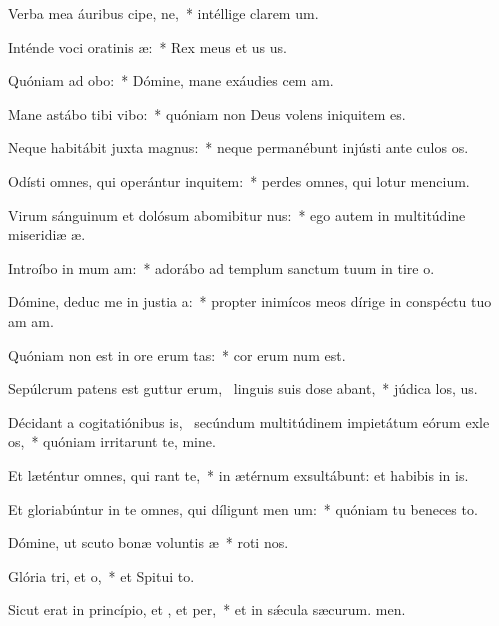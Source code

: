 \item Verba mea áuribus cipe, ne,~* intéllige clarem um.
\item Inténde voci oratinis æ:~* Rex meus et us us.
\item Quóniam ad  obo:~* Dómine, mane exáudies cem am.
\item Mane astábo tibi  vibo:~* quóniam non Deus volens iniquitem  es.
\item Neque habitábit juxta  magnus:~* neque permanébunt injústi ante culos os.
\item Odísti omnes, qui operántur inquitem:~* perdes omnes, qui lotur mencium.
\item Virum sánguinum et dolósum abomibitur nus:~* ego autem in multitúdine miseridiæ æ.
\item Introíbo in mum am:~* adorábo ad templum sanctum tuum in tire o.
\item Dómine, deduc me in justia a:~* propter inimícos meos dírige in conspéctu tuo am am.
\item Quóniam non est in ore erum tas:~* cor erum num est.
\item Sepúlcrum patens est guttur erum,~\pscross{} linguis suis dose abant,~* júdica los, us.
\item Décidant a cogitatiónibus is,~\pscross{} secúndum multitúdinem impietátum eórum exle os,~* quóniam irritarunt te, mine.
\item Et læténtur omnes, qui rant  te,~* in ætérnum exsultábunt: et habibis in is.
\item Et gloriabúntur in te omnes, qui díligunt men um:~* quóniam tu beneces to.
\item Dómine, ut scuto bonæ voluntis æ~* roti nos.
\item Glória tri, et o,~* et Spitui to.
\item Sicut erat in princípio, et , et per,~* et in sǽcula sæcurum. men.
